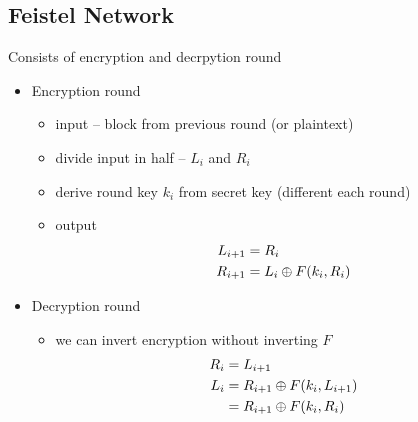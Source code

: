 \documentclass[final]{article}
\begin{document}
\subsection{Feistel Network}
Consists of encryption and decrpytion round
\begin{itemize}[nosep]
    \item Encryption round
          \begin{itemize}[nosep]
              \item input -- block from previous round (or plaintext)
              \item divide input in half -- $L_i$ and $R_i$
              \item derive round key $k_i$ from secret key (different each round)
              \item output
                    \begin{align*}
                        L_{i+1} & = R_i                  \\
                        R_{i+1} & = L_i \oplus F(k_i, R_i)
                    \end{align*}
          \end{itemize}
    \item Decryption round
          \begin{itemize}[nosep]
              \item we can invert encryption without inverting $F$
                    \begin{align*}
                        R_i & = L_{i + 1}                        \\
                        L_i & = R_{i + 1} \oplus F(k_i, L_{i + 1}) \\
                            & = R_{i + 1} \oplus F(k_i, R_i)
                    \end{align*}
          \end{itemize}
\end{itemize}
\end{document}
